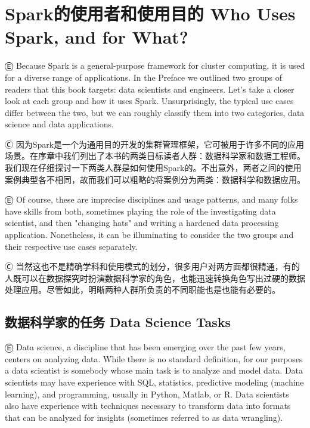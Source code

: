\section{Spark的使用者和使用目的 Who Uses Spark, and for What?}\label{spark-who-uses-spark-and-for-what}

Ⓔ \textcolor{etc}{Because Spark is a general-purpose framework for cluster computing, it is used for a diverse range of applications. In the Preface we outlined two groups of readers that this book targets: data scientists and engineers. Let's take a closer look at each group and how it uses Spark. Unsurprisingly, the typical use cases differ between the two, but we can roughly classify them into two categories, data science and data applications.}

Ⓒ 因为Spark是一个为通用目的开发的集群管理框架，它可被用于许多不同的应用场景。在序章中我们列出了本书的两类目标读者人群：数据科学家和数据工程师。我们现在仔细探讨一下两类人群是如何使用Spark的。不出意外，两者之间的使用案例典型各不相同，故而我们可以粗略的将案例分为两类：数据科学和数据应用。

Ⓔ \textcolor{etc}{Of course, these are imprecise disciplines and usage patterns, and many folks have skills from both, sometimes playing the role of the investigating data scientist, and then "changing hats" and writing a hardened data processing application. Nonetheless, it can be illuminating to consider the two groups and their respective use cases separately.}

Ⓒ 当然这也不是精确学科和使用模式的划分，很多用户对两方面都很精通，有的人既可以在数据探究时扮演数据科学家的角色，也能迅速转换角色写出过硬的数据处理应用。尽管如此，明晰两种人群所负责的不同职能也是也能有必要的。

\subsection{数据科学家的任务 Data Science Tasks}\label{data-science-tasks}

Ⓔ \textcolor{etc}{Data science, a discipline that has been emerging over the past few years, centers on analyzing data. While there is no standard definition, for our purposes a data scientist is somebody whose main task is to analyze and model data. Data scientists may have experience with SQL, statistics, predictive modeling (machine learning), and programming, usually in Python, Matlab, or R. Data scientists also have experience with techniques necessary to transform data into formats that can be analyzed for insights (sometimes referred to as data wrangling).}

